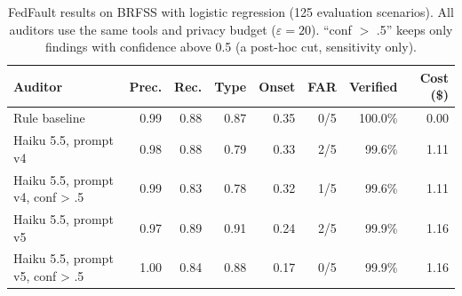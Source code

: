 \begin{table}[t]
\centering
\small
\caption{FedFault results on BRFSS with logistic regression (125 evaluation scenarios). All auditors use the same tools and privacy budget ($\varepsilon=20$). ``conf $>$ .5'' keeps only findings with confidence above 0.5 (a post-hoc cut, sensitivity only).}
\label{tab:main}
\begin{tabular}{lrrrrrrr}
\toprule
Auditor & Prec. & Rec. & Type & Onset & FAR & Verified & Cost (\$) \\
\midrule
Rule baseline & 0.99 & 0.88 & 0.87 & 0.35 & 0/5 & 100.0\% & 0.00 \\
Haiku 5.5, prompt v4 & 0.98 & 0.88 & 0.79 & 0.33 & 2/5 & 99.6\% & 1.11 \\
Haiku 5.5, prompt v4, conf > .5 & 0.99 & 0.83 & 0.78 & 0.32 & 1/5 & 99.6\% & 1.11 \\
Haiku 5.5, prompt v5 & 0.97 & 0.89 & 0.91 & 0.24 & 2/5 & 99.9\% & 1.16 \\
Haiku 5.5, prompt v5, conf > .5 & 1.00 & 0.84 & 0.88 & 0.17 & 0/5 & 99.9\% & 1.16 \\
\bottomrule
\end{tabular}
\end{table}
